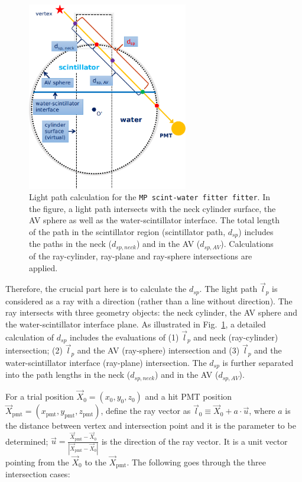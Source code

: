 \begin{figure}[!htb]
	\centering
	\includegraphics[width=7cm]{scintpath.png}
	\caption[Light path calculation for the \texttt{MP scint-water fitter fitter}.]{Light path calculation for the \texttt{MP scint-water fitter fitter}. In the figure, a light path intersects with the neck cylinder surface, the AV sphere as well as the water-scintillator interface. The total length of the path in the scintillator region (scintillator path, $d_{sp}$) includes the paths in the neck ($d_{sp,neck}$) and in the AV ($d_{sp,AV}$). Calculations of the ray-cylinder, ray-plane and ray-sphere intersections are applied.}
	\label{fig:scintpath}
\end{figure}

Therefore, the crucial part here is to calculate the $d_{sp}$. The light path $\vec{l}_p$ is considered as a ray with a direction (rather than a line without direction). The ray intersects with three geometry objects: the neck cylinder, the AV sphere and the water-scintillator interface plane. As illustrated in Fig.~\ref{fig:scintpath}, a detailed calculation of $d_{sp}$ includes the evaluations of (1) $\vec{l}_p$ and neck (ray-cylinder) intersection; (2) $\vec{l}_p$ and the AV (ray-sphere) intersection and (3) $\vec{l}_p$ and the water-scintillator interface (ray-plane) intersection. The $d_{sp}$ is further separated into the path lengths in the neck ($d_{sp,neck}$) and in the AV ($d_{sp,AV}$). 

For a trial position $\vec{X}_0=(x_0,y_0,z_0)$ and a hit PMT position $\vec{X}_{\mathrm{pmt}}=(x_\mathrm{pmt},y_\mathrm{pmt},z_\mathrm{pmt})$, define the ray vector as $\vec{l}_0\equiv\vec{X}_0+a\cdot \vec{u}$, where $a$ is the distance between vertex and intersection point and it is the parameter to be determined; $\vec u=\frac{\vec{X}_{\mathrm{pmt}}-\vec{X}_0}{|\vec{X}_{\mathrm{pmt}}-\vec{X}_0|}$ is the direction of the ray vector. It is a unit vector pointing from the $\vec{X}_0$ to the $\vec{X}_{\mathrm{pmt}}$. The following goes through the three intersection cases:

